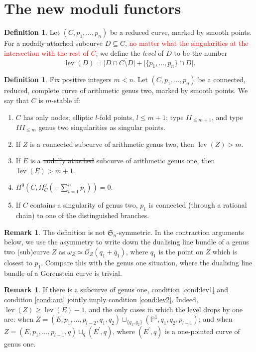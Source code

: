 \documentclass[11pt]{amsart}
\newcommand{\PP}{\mathbb P}
\newcommand{\OO}{\mathcal O}
\newcommand{\lev}{\operatorname{lev}}
\theoremstyle{plain}
\theoremstyle{definition}
\newtheorem{dfn}[thm]{Definition}
\newtheorem{rem}[thm]{Remark}
\begin{document}
\section{The new moduli functors}
\begin{dfn}
 Let $(C,p_1,\ldots,p_n)$ be a reduced curve, marked by smooth points. For a \sout{nodally attached} subcurve $D\subseteq C$, \textcolor{red}{no matter what the singularities at the intersection with the rest of $C$}, we define the \emph{level} of $D$ to be the number \[ \lev(D)=\lvert D\cap\overline{C\setminus D}\rvert+\lvert\{p_1,\ldots,p_n\}\cap D\rvert.\]
\end{dfn}
\begin{dfn}
 Fix positive integers $m<n$. Let $(C,p_1,\ldots,p_n)$ be a connected, reduced, complete curve of arithmetic genus two, marked by smooth points. We say that $C$ is $m$-stable if:
 \begin{enumerate}
  \item\label{cond:sing} $C$ has only nodes; elliptic $l$-fold points, $l\leq m+1$; type $I\!I_{\leq m+1}$, and type $I\!I\!I_{\leq m}$ genus two singularities as singular points.
  \item\label{cond:lev2} If $Z$ is a connected subcurve of arithmetic genus two, then $\lev(Z)>m$.
  \item\label{cond:lev1} If $E$ is a \sout{nodally attached} subcurve of arithmetic genus one, then $\lev(E)>m+1$.
  \item\label{cond:aut} $H^0(C,\Omega_C^\vee(-\sum_{i=1}^n p_i))=0$.
  \item\label{cond:p1} If $C$ contains a singularity of genus two, $p_1$ is connected (through a rational chain) to one of the distinguished branches.
 \end{enumerate}
\end{dfn}

\begin{rem}
 The definition is not $\mathfrak{S}_n$-symmetric. In the contraction arguments below, we use the asymmetry to write down the dualising line bundle of a genus two (sub)curve $Z$ as $\omega_Z\simeq\OO_Z(q_1+\bar q_1)$, where $q_1$ is the point on $Z$ which is closest to $p_1$. Compare this with the genus one situation, where the dualising line bundle of a Gorenstein curve is trivial.
\end{rem}
\begin{rem}\label{rmk:lev1solev2}
 If there is a subcurve of genus one, condition \eqref{cond:lev1} and condition \eqref{cond:aut} jointly imply condition \eqref{cond:lev2}. Indeed, $\lev(Z)\geq\lev(E)-1$, and the only cases in which the level drops by one are: when $Z=(E,p_1,\ldots,p_{l-2},q_1,q_2)\sqcup_{\{q_1,q_2\}}(\PP^1,q_1,q_2,p_{l-1})$; and when $Z=(E,p_1,\ldots,p_{l-1},q)\sqcup_q(E^\prime,q)$, where $(E^\prime,q)$ is a one-pointed curve of genus one.
\end{rem}
\end{document}
